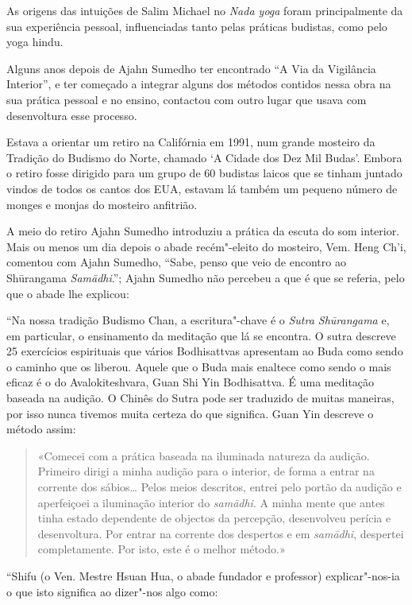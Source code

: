 As origens das intuições de Salim Michael no \emph{Nada yoga} foram
principalmente da sua experiência pessoal, influenciadas tanto pelas
práticas budistas, como pelo yoga hindu.

Alguns anos depois de Ajahn Sumedho ter encontrado ``A Via da Vigilância
Interior'', e ter começado a integrar alguns dos métodos contidos nessa
obra na sua prática pessoal e no ensino, contactou com outro lugar que
usava com desenvoltura esse processo.

Estava a orientar um retiro na Califórnia em 1991, num grande mosteiro
da Tradição do Budismo do Norte, chamado `A Cidade dos Dez Mil Budas'.
Embora o retiro fosse dirigido para um grupo de 60 budistas laicos que
se tinham juntado vindos de todos os cantos dos EUA, estavam lá também
um pequeno número de monges e monjas do mosteiro anfitrião.

A meio do retiro Ajahn Sumedho introduziu a prática da escuta do som
interior. Mais ou menos um dia depois o abade recém"-eleito do mosteiro,
Vem. Heng Ch'i, comentou com Ajahn Sumedho, ``Sabe, penso que veio de
encontro ao Shūrangama \emph{Samādhi}.''; Ajahn Sumedho não percebeu a
que é que se referia, pelo que o abade lhe explicou:

``Na nossa tradição Budismo Chan, a escritura"-chave é o \emph{Sutra
Shūrangama} e, em particular, o ensinamento da meditação que lá se
encontra. O sutra descreve 25 exercícios espirituais que vários
Bodhisattvas apresentam ao Buda como sendo o caminho que os liberou.
Aquele que o Buda mais enaltece como sendo o mais eficaz é o do
Avalokiteshvara, Guan Shi Yin Bodhisattva. É uma meditação baseada na
audição. O Chinês do Sutra pode ser traduzido de muitas maneiras, por
isso nunca tivemos muita certeza do que significa. Guan Yin descreve o
método assim:

\begin{quotation}
«Comecei com a prática baseada na iluminada natureza da audição.
Primeiro dirigi a minha audição para o interior, de forma a entrar na
corrente dos sábios\ldots{} Pelos meios descritos, entrei pelo portão da
audição e aperfeiçoei a iluminação interior do \emph{samādhi}. A minha
mente que antes tinha estado dependente de objectos da percepção,
desenvolveu perícia e desenvoltura. Por entrar na corrente dos despertos
e em \emph{samādhi}, despertei completamente. Por isto, este é o melhor
método.»\cite{surangama}
\end{quotation}

``Shifu (o Ven. Mestre Hsuan Hua, o abade fundador e professor)
explicar"-nos-ia o que isto significa ao dizer"-nos algo como:

